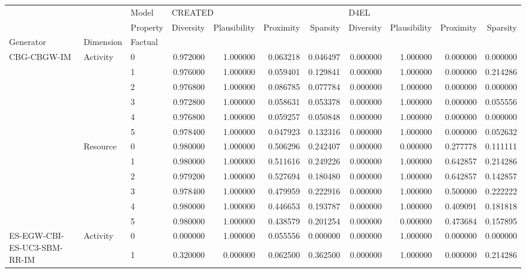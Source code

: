 \begin{tabular}{lllrrrrrrrr}
\toprule
 &  & Model & \multicolumn{4}{l}{CREATED} & \multicolumn{4}{l}{D4EL} \\
 &  & Property & Diversity & Plausibility & Proximity & Sparsity & Diversity & Plausibility & Proximity & Sparsity \\
Generator & Dimension & Factual &  &  &  &  &  &  &  &  \\
\midrule
\multirow[t]{12}{*}{CBG-CBGW-IM} & \multirow[t]{6}{*}{Activity} & 0 & 0.972000 & 1.000000 & 0.063218 & 0.046497 & 0.000000 & 1.000000 & 0.000000 & 0.000000 \\
 &  & 1 & 0.976000 & 1.000000 & 0.059401 & 0.129841 & 0.000000 & 1.000000 & 0.000000 & 0.214286 \\
 &  & 2 & 0.976800 & 1.000000 & 0.086785 & 0.077784 & 0.000000 & 1.000000 & 0.000000 & 0.000000 \\
 &  & 3 & 0.972800 & 1.000000 & 0.058631 & 0.053378 & 0.000000 & 1.000000 & 0.000000 & 0.055556 \\
 &  & 4 & 0.976800 & 1.000000 & 0.059257 & 0.050848 & 0.000000 & 1.000000 & 0.000000 & 0.000000 \\
 &  & 5 & 0.978400 & 1.000000 & 0.047923 & 0.132316 & 0.000000 & 1.000000 & 0.000000 & 0.052632 \\
\cline{2-11}
 & \multirow[t]{6}{*}{Resource} & 0 & 0.980000 & 1.000000 & 0.506296 & 0.242407 & 0.000000 & 0.000000 & 0.277778 & 0.111111 \\
 &  & 1 & 0.980000 & 1.000000 & 0.511616 & 0.249226 & 0.000000 & 1.000000 & 0.642857 & 0.214286 \\
 &  & 2 & 0.979200 & 1.000000 & 0.527694 & 0.180480 & 0.000000 & 1.000000 & 0.642857 & 0.142857 \\
 &  & 3 & 0.978400 & 1.000000 & 0.479959 & 0.222916 & 0.000000 & 1.000000 & 0.500000 & 0.222222 \\
 &  & 4 & 0.980000 & 1.000000 & 0.446653 & 0.193787 & 0.000000 & 1.000000 & 0.409091 & 0.181818 \\
 &  & 5 & 0.980000 & 1.000000 & 0.438579 & 0.201254 & 0.000000 & 0.000000 & 0.473684 & 0.157895 \\
\cline{1-11} \cline{2-11}
\multirow[t]{12}{*}{ES-EGW-CBI-ES-UC3-SBM-RR-IM} & \multirow[t]{6}{*}{Activity} & 0 & 0.000000 & 1.000000 & 0.055556 & 0.000000 & 0.000000 & 1.000000 & 0.000000 & 0.000000 \\
 &  & 1 & 0.320000 & 0.000000 & 0.062500 & 0.362500 & 0.000000 & 1.000000 & 0.000000 & 0.214286 \\

\end{tabular}
